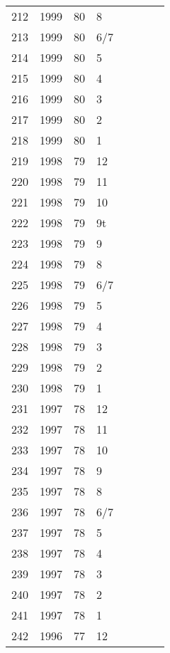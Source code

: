 \begin{longtable}{ |l|l|l|l|l|l|l|l| }
212 & 1999 & 80 &     8 &         &  &  & \\
213 & 1999 & 80 &   6/7 &         &  &  & \\
214 & 1999 & 80 &     5 &         &  &  & \\
215 & 1999 & 80 &     4 &         &  &  & \\
216 & 1999 & 80 &     3 &         &  &  & \\
217 & 1999 & 80 &     2 &         &  &  & \\
218 & 1999 & 80 &     1 &         &  &  & \\
219 & 1998 & 79 &    12 &         &  &  & \\
220 & 1998 & 79 &    11 &         &  &  & \\
221 & 1998 & 79 &    10 &         &  &  & \\
222 & 1998 & 79 &    9t &         &  &  & \\
223 & 1998 & 79 &     9 &         &  &  & \\
224 & 1998 & 79 &     8 &         &  &  & \\
225 & 1998 & 79 &   6/7 &         &  &  & \\
226 & 1998 & 79 &     5 &         &  &  & \\
227 & 1998 & 79 &     4 &         &  &  & \\
228 & 1998 & 79 &     3 &         &  &  & \\
229 & 1998 & 79 &     2 &         &  &  & \\
230 & 1998 & 79 &     1 &         &  &  & \\
231 & 1997 & 78 &    12 &         &  &  & \\
232 & 1997 & 78 &    11 &         &  &  & \\
233 & 1997 & 78 &    10 &         &  &  & \\
234 & 1997 & 78 &     9 &         &  &  & \\
235 & 1997 & 78 &     8 &         &  &  & \\
236 & 1997 & 78 &   6/7 &         &  &  & \\
237 & 1997 & 78 &     5 &         &  &  & \\
238 & 1997 & 78 &     4 &         &  &  & \\
239 & 1997 & 78 &     3 &         &  &  & \\
240 & 1997 & 78 &     2 &         &  &  & \\
241 & 1997 & 78 &     1 &         &  &  & \\
242 & 1996 & 77 &    12 &         &  &  & \\

\end{longtable}
